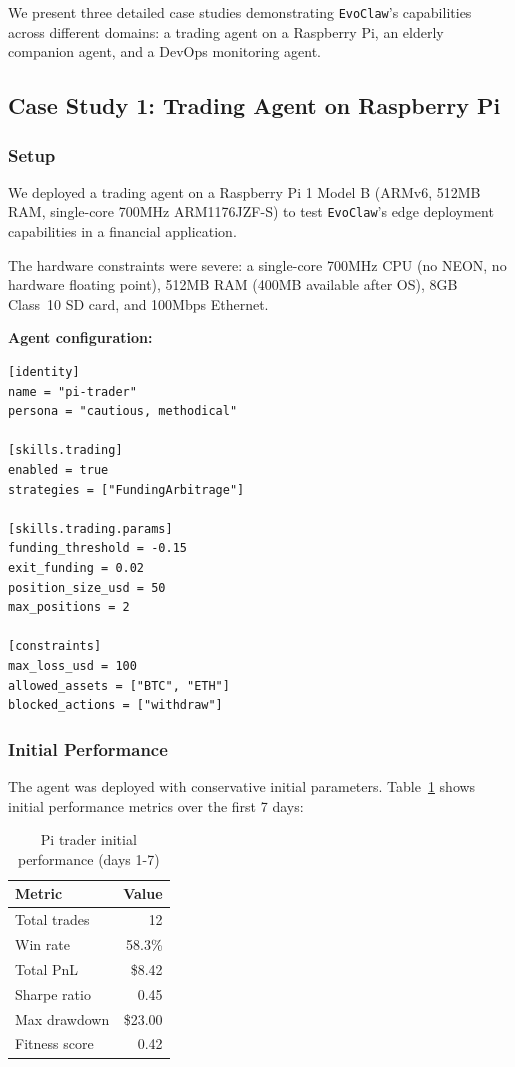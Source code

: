 \documentclass[conference]{IEEEtran}
\newcommand{\evoclaw}{\texttt{EvoClaw}\xspace}
\begin{document}
We present three detailed case studies demonstrating \evoclaw{}'s capabilities across different domains: a trading agent on a Raspberry Pi, an elderly companion agent, and a DevOps monitoring agent.

\subsection{Case Study 1: Trading Agent on Raspberry Pi}

\subsubsection{Setup}

We deployed a trading agent on a Raspberry Pi 1 Model B (ARMv6, 512MB RAM, single-core 700MHz ARM1176JZF-S) to test \evoclaw{}'s edge deployment capabilities in a financial application.

The hardware constraints were severe: a single-core 700MHz CPU (no NEON, no hardware floating point), 512MB RAM (400MB available after OS), 8GB Class~10 SD card, and 100Mbps Ethernet.

\textbf{Agent configuration:}
\begin{lstlisting}[style=tomlcode]
[identity]
name = "pi-trader"
persona = "cautious, methodical"

[skills.trading]
enabled = true
strategies = ["FundingArbitrage"]

[skills.trading.params]
funding_threshold = -0.15
exit_funding = 0.02
position_size_usd = 50
max_positions = 2

[constraints]
max_loss_usd = 100
allowed_assets = ["BTC", "ETH"]
blocked_actions = ["withdraw"]
\end{lstlisting}

\subsubsection{Initial Performance}

The agent was deployed with conservative initial parameters. Table~\ref{tab:pi_initial} shows initial performance metrics over the first 7 days:

\begin{table}[h]
\centering
\caption{Pi trader initial performance (days 1-7)}
\label{tab:pi_initial}
\begin{tabular}{lr}
\toprule
\textbf{Metric} & \textbf{Value} \\
\midrule
Total trades & 12 \\
Win rate & 58.3\% \\
Total PnL & \$8.42 \\
Sharpe ratio & 0.45 \\
Max drawdown & \$23.00 \\
Fitness score & 0.42 \\
\bottomrule
\end{tabular}
\end{table}
\end{document}
